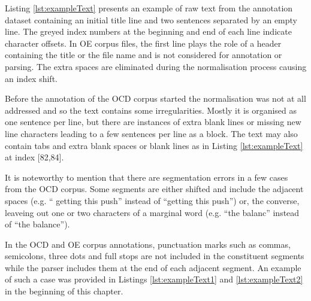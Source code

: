     Listing \ref{lst:exampleText} presents an example of raw text from the annotation dataset containing an initial title line and two sentences separated by an empty line. The greyed index numbers at the beginning and end of each line indicate character offsets. In OE corpus files, the first line plays the role of a header containing the title or the file name and is not considered for annotation or parsing. The extra spaces are eliminated during the normalisation process causing an index shift. 
    
    Before the annotation of the OCD corpus started the normalisation was not at all addressed and so the text contains some irregularities. Mostly it is organised as one sentence per line, but there are instances of extra blank lines or missing new line characters leading to a few sentences per line as a block. The text may also contain tabs and extra blank spaces or blank lines as in Listing \ref{lst:exampleText} at index [82,84]. 

    It is noteworthy to mention that there are segmentation errors in a few cases from the OCD corpus. Some segments are either shifted and include the adjacent spaces (e.g. `` getting this push'' instead of ``getting this push'') or, the converse, leaveing out one or two characters of a marginal word (e.g. ``the balanc'' instead of ``the balance'').  


    In the OCD and OE corpus annotations, punctuation marks such as commas, semicolons, three dots and full stops are not included in the constituent segments while the parser includes them at the end of each adjacent segment. An example of such a case was provided in Listings \ref{lst:exampleText1} and \ref{lst:exampleText2} in the beginning of this chapter. 
    
